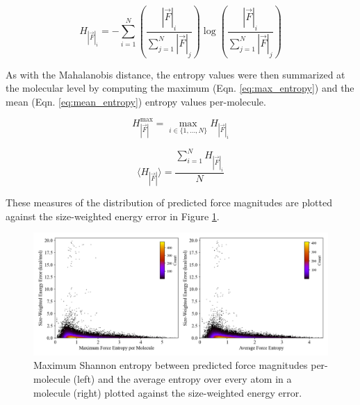 \begin{equation}
    H_{|\vec{F}|_i} = - \sum_{i=1}^{N} \left( \frac{|\vec{F}|_i}{\sum_{j=1}^{N} |\vec{F}|_j} \right) \log \left( \frac{|\vec{F}|_i}{\sum_{j=1}^{N} |\vec{F}|_j} \right)
    \label{eq:entropy}
\end{equation}

As with the Mahalanobis distance, the entropy values were then summarized at the molecular level by computing the maximum (Eqn. \ref{eq:max_entropy}) and the mean (Eqn. \ref{eq:mean_entropy}) entropy values per-molecule. 

\begin{equation}
    H_{|\vec{F}|}^{\max} = \max_{i \in \{1, \dots, N\}} H_{|\vec{F}|_i}
    \label{eq:max_entropy}
\end{equation}

\begin{equation}
    \langle H_{|\vec{F}|} \rangle = \frac{\sum_{i=1}^{N} H_{|\vec{F}|_i}}{N}
    \label{eq:mean_entropy}
\end{equation}

These measures of the distribution of predicted force magnitudes are plotted against the size-weighted energy error in Figure \ref{fig:entropy}.

\begin{figure}[!ht]
    \centering
    \includegraphics[width=1\linewidth]{Images/2xr_forces/force_entropy-vs-energy.png}
    \caption[Shannon entropy ensemble predictions of force magnitude]{Maximum Shannon entropy between predicted force magnitudes per-molecule (left) and the average entropy over every atom in a molecule (right) plotted against the size-weighted energy error.}
    \label{fig:entropy}
\end{figure}

